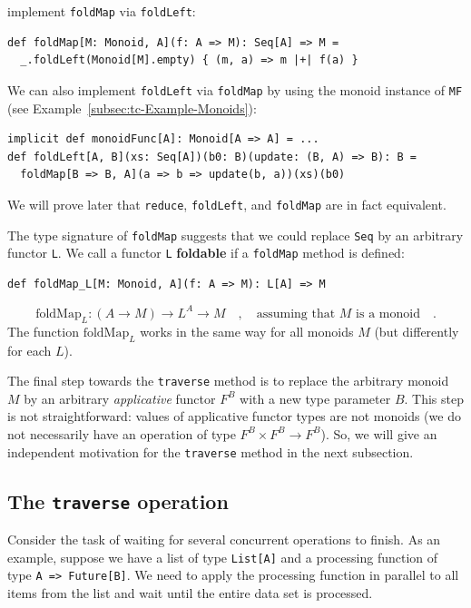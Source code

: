 implement \lstinline!foldMap! via \lstinline!foldLeft!:
\begin{lstlisting}
def foldMap[M: Monoid, A](f: A => M): Seq[A] => M =
  _.foldLeft(Monoid[M].empty) { (m, a) => m |+| f(a) }
\end{lstlisting}
We can also implement \lstinline!foldLeft! via \lstinline!foldMap!
by using the monoid instance of \lstinline!MF! (see Example~\ref{subsec:tc-Example-Monoids}):
\begin{lstlisting}
implicit def monoidFunc[A]: Monoid[A => A] = ...
def foldLeft[A, B](xs: Seq[A])(b0: B)(update: (B, A) => B): B =
  foldMap[B => B, A](a => b => update(b, a))(xs)(b0)
\end{lstlisting}
We will prove later that \lstinline!reduce!, \lstinline!foldLeft!,
and \lstinline!foldMap! are in fact equivalent.

The type signature of \lstinline!foldMap! suggests that we could
replace \lstinline!Seq! by an arbitrary functor \lstinline!L!. We
call a functor \lstinline!L! \textbf{foldable}
if a \lstinline!foldMap! method is defined:
\begin{lstlisting}
def foldMap_L[M: Monoid, A](f: A => M): L[A] => M
\end{lstlisting}
\[
\text{foldMap}_{L}:\left(A\rightarrow M\right)\rightarrow L^{A}\rightarrow M\quad,\quad\text{assuming that }M\text{ is a monoid}\quad.
\]
The function $\text{foldMap}_{L}$ works in the same way for all monoids
$M$ (but differently for each $L$). 

The final step towards the \lstinline!traverse! method is to replace
the arbitrary monoid $M$ by an arbitrary \emph{applicative} functor
$F^{B}$ with a new type parameter $B$. This step is not straightforward:
values of applicative functor types are not monoids (we do not necessarily
have an operation of type $F^{B}\times F^{B}\rightarrow F^{B}$).
So, we will give an independent motivation for the \lstinline!traverse!
method in the next subsection.

\subsection{The \texttt{traverse} operation\label{subsec:The-traverse-operation}}

Consider the task of waiting for several concurrent operations to
finish. As an example, suppose we have a list of type \lstinline!List[A]!
and a processing function of type \lstinline!A => Future[B]!. We
need to apply the processing function in parallel to all items from
the list and wait until the entire data set is processed.


